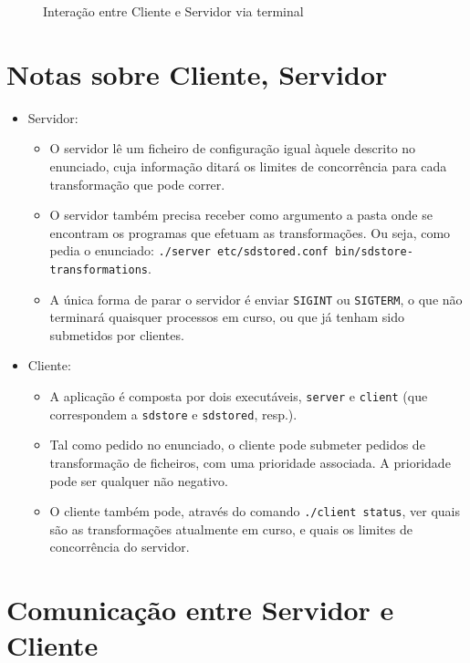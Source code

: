 \documentclass[11pt,a4paper]{report}%
\begin{document}
\begin{figure}
  \centering
  
  \caption{Interação entre Cliente e Servidor via terminal}
\end{figure}

\newpage

\section{Notas sobre Cliente, Servidor}

\begin{itemize}
  \item Servidor:
  \begin{itemize}
    \item O servidor lê um ficheiro de configuração igual àquele descrito no enunciado,
    cuja informação ditará os limites de concorrência para cada transformação que pode correr.
    \item O servidor também precisa receber como argumento a pasta onde se encontram
    os programas que efetuam as transformações. Ou seja, como pedia o enunciado:
    \texttt{./server etc/sdstored.conf bin/sdstore-transformations}.
    \item A única forma de parar o servidor é enviar \texttt{SIGINT} ou \texttt{SIGTERM},
    o que não terminará quaisquer processos em curso, ou que já tenham sido submetidos por clientes.
  \end{itemize}

  \item Cliente:
  \begin{itemize}
    \item A aplicação é composta por dois executáveis, \texttt{server} e \texttt{client}
    (que correspondem a \texttt{sdstore} e \texttt{sdstored}, resp.).
    \item Tal como pedido no enunciado, o cliente pode submeter pedidos de transformação
    de ficheiros, com uma prioridade associada. A prioridade pode ser qualquer não negativo.
    \item O cliente também pode, através do comando \texttt{./client status}, ver quais são as
    transformações atualmente em curso, e quais os limites de concorrência do servidor.
  \end{itemize}
\end{itemize}

\section{Comunicação entre Servidor e Cliente}
\end{document}
